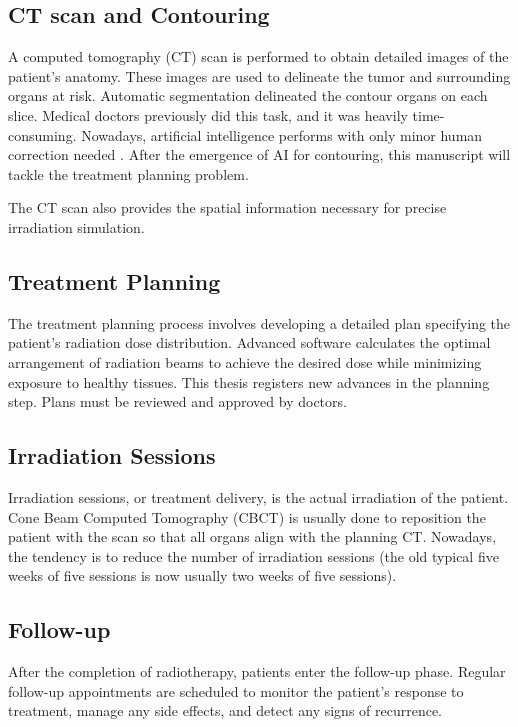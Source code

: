 \subsection{CT scan and Contouring}
A computed tomography (CT) scan is performed to obtain detailed images of the patient's anatomy.
These images are used to delineate the tumor and surrounding organs at risk.
Automatic segmentation delineated the contour organs on each slice.
Medical doctors previously did this task, and it was heavily time-consuming.
Nowadays, artificial intelligence performs with only minor human correction needed \cite{Strolin2023} \cite{Bustos2023}.
After the emergence of AI for contouring, this manuscript will tackle the treatment planning problem.

The CT scan also provides the spatial information necessary for precise irradiation simulation.

\subsection{Treatment Planning}
The treatment planning process involves developing a detailed plan specifying the patient's radiation dose distribution.
Advanced software calculates the optimal arrangement of radiation beams to achieve the desired dose while minimizing exposure to healthy tissues.
This thesis registers new advances in the planning step.
Plans must be reviewed and approved by doctors.

\subsection{Irradiation Sessions}
Irradiation sessions, or treatment delivery, is the actual irradiation of the patient.
Cone Beam Computed Tomography (CBCT) is usually done to reposition the patient with the scan so that all organs align with the planning CT.
Nowadays, the tendency is to reduce the number of irradiation sessions (the old typical five weeks of five sessions is now usually two weeks of five sessions).

\subsection{Follow-up}
After the completion of radiotherapy, patients enter the follow-up phase.
Regular follow-up appointments are scheduled to monitor the patient's response to treatment, manage any side effects, and detect any signs of recurrence.



